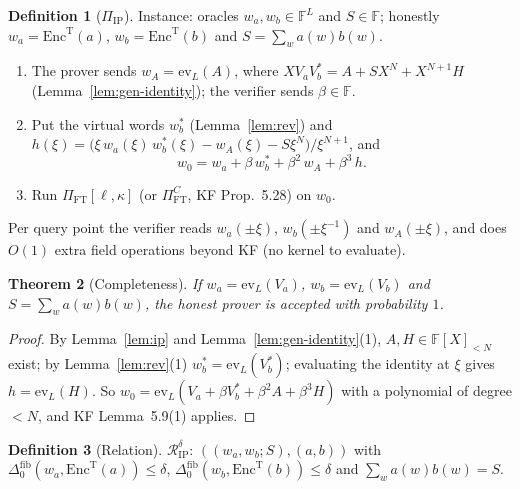 \documentclass[11pt]{article}
\newtheorem{theorem}{Theorem}
\theoremstyle{definition}
\newtheorem{definition}[theorem]{Definition}
\newcommand{\F}{\mathbb{F}}
\newcommand{\ev}{\mathrm{ev}}
\begin{document}
\begin{definition}[$\Pi_{\mathrm{IP}}$]
Instance: oracles $w_a,w_b\in\F^L$ and $S\in\F$; honestly $w_a=\mathrm{Enc}^{\mathrm T}(a)$, $w_b=\mathrm{Enc}^{\mathrm T}(b)$ and $S=\sum_wa(w)b(w)$.
\begin{enumerate}[nosep]
\item The prover sends $w_A=\ev_L(A)$, where $XV_aV_b^\ast=A+SX^N+X^{N+1}H$ (Lemma~\ref{lem:gen-identity}); the verifier sends $\beta\in\F$.
\item Put the virtual words $w_b^\ast$ (Lemma~\ref{lem:rev}) and
$h(\xi)=\bigl(\xi\,w_a(\xi)\,w_b^\ast(\xi)-w_A(\xi)-S\xi^N\bigr)/\xi^{N+1}$, and
\[w_0=w_a+\beta\,w_b^\ast+\beta^2\,w_A+\beta^3\,h.\]
\item Run $\Pi_{\mathrm{FT}}[\ell,\kappa]$ (or $\Pi^C_{\mathrm{FT}}$, KF Prop.~5.28) on $w_0$.
\end{enumerate}
Per query point the verifier reads $w_a(\pm\xi)$, $w_b(\pm\xi^{-1})$ and $w_A(\pm\xi)$, and does $O(1)$ extra field operations beyond KF (no kernel to evaluate).
\end{definition}

\begin{theorem}[Completeness]
If $w_a=\ev_L(V_a)$, $w_b=\ev_L(V_b)$ and $S=\sum_wa(w)b(w)$, the honest prover is accepted with probability $1$.
\end{theorem}
\begin{proof}
By Lemma~\ref{lem:ip} and Lemma~\ref{lem:gen-identity}(1), $A,H\in\F[X]_{<N}$ exist; by Lemma~\ref{lem:rev}(1) $w_b^\ast=\ev_L(V_b^\ast)$; evaluating the identity at $\xi$ gives $h=\ev_L(H)$. So $w_0=\ev_L(V_a+\beta V_b^\ast+\beta^2A+\beta^3H)$ with a polynomial of degree $<N$, and KF Lemma~5.9(1) applies.
\end{proof}

\begin{definition}[Relation]
$\mathcal R^\delta_{\mathrm{IP}}$: $((w_a,w_b;S),(a,b))$ with $\Delta^{\mathrm{fib}}_0(w_a,\mathrm{Enc}^{\mathrm T}(a))\le\delta$, $\Delta^{\mathrm{fib}}_0(w_b,\mathrm{Enc}^{\mathrm T}(b))\le\delta$ and $\sum_wa(w)b(w)=S$.
\end{definition}
\end{document}
